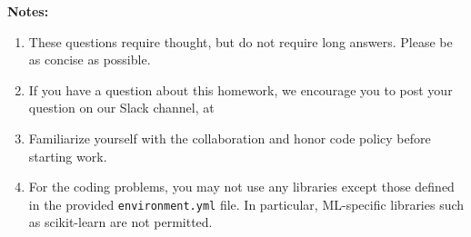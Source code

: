 {\bf Notes:}
\begin{enumerate}
    \item These questions require thought, but do not require long answers. Please be as concise as possible.
    \item If you have a question about this homework, we encourage you to post your question on our Slack channel, at \slack
    \item Familiarize yourself with the collaboration and honor code policy before starting work.
    \item For the coding problems, you may not use any libraries except those defined in the provided \texttt{environment.yml} file. In particular, ML-specific libraries such as scikit-learn are not permitted.
\end{enumerate}
